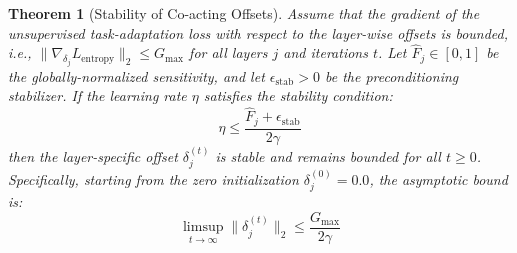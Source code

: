 \documentclass{article}
\theoremstyle{plain}
\newtheorem{theorem}{Theorem}[section]
\theoremstyle{definition}
\theoremstyle{remark}
\begin{document}
\begin{theorem}[Stability of Co-acting Offsets]
\label{thm:stability}
Assume that the gradient of the unsupervised task-adaptation loss with respect to the layer-wise offsets is bounded, i.e., $\|\nabla_{\delta_j} L_{\text{entropy}}\|_2 \le G_{\max}$ for all layers $j$ and iterations $t$. Let $\hat{F}_j \in [0, 1]$ be the globally-normalized sensitivity, and let $\epsilon_{\text{stab}} > 0$ be the preconditioning stabilizer. If the learning rate $\eta$ satisfies the stability condition:
\begin{equation}
    \eta \le \frac{\hat{F}_j + \epsilon_{\text{stab}}}{2\gamma}
\end{equation}
then the layer-specific offset $\delta_j^{(t)}$ is stable and remains bounded for all $t \ge 0$. Specifically, starting from the zero initialization $\delta_j^{(0)} = 0.0$, the asymptotic bound is:
\begin{equation}
    \limsup_{t \to \infty} \|\delta_j^{(t)}\|_2 \le \frac{G_{\max}}{2\gamma}
\end{equation}
\end{theorem}
\end{document}
